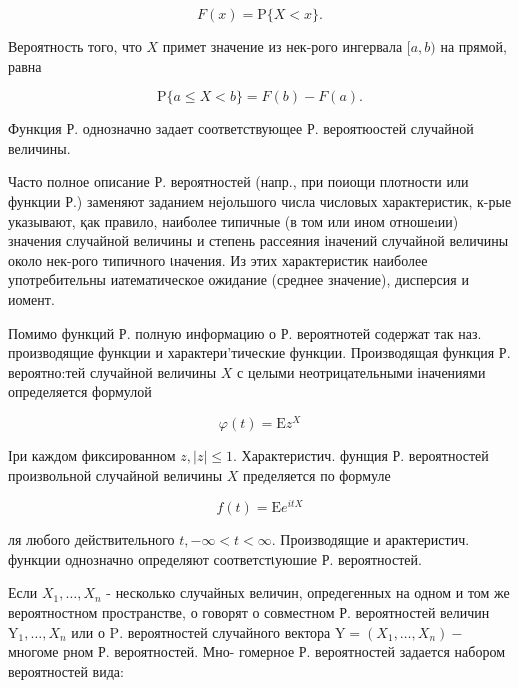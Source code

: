 \documentclass[10pt]{article}
\begin{document}
\[

F(x)=\mathrm{P}\{X<x\} .

\]



Вероятность того, что $X$ примет значение из нек-рого ингервала $[a, b)$ на прямой, равна



\[

\mathrm{P}\{a \leqslant X<b\}=F(b)-F(a) .

\]



Функция Р. однозначно задает соответствующее Р. вероятюостей случайной величины.



Часто полное описание Р. вероятностей (напр., при поиощи плотности или функции Р.) заменяют заданием нејольшого числа числовых характеристик, к-рые указывают, қак правило, наиболее типичные (в том или ином отношеıии) значения случайной величины и степень рассеяния іначений случайной величины около нек-рого типичного เначения. Из этих характеристик наиболее употребительны иатематическое ожидание (среднее значение), дисперсия и иомент.



Помимо функций Р. полную информацию о Р. вероятнотей содержат так наз. производящие функции и характери'тические функции. Производящая функция Р. вероятно:тей случайной величины $X$ с целыми неотрицательными іначениями определяется формулой



\[

\varphi(t)=\mathrm{E} z^{X}

\]



Іри каждом фиксированном $z,|z| \leqslant 1$. Характеристич. фунщия Р. вероятностей произвольной случайной величины $X$ пределяется по формуле



\[

f(t)=\mathrm{E} e^{i t X}

\]



ля любого действительного $t,-\infty<t<\infty$. Производящие и арактеристич. функции однозначно определяют соответстเуюшие Р. вероятностей.



Если $X_{1}, \ldots, X_{n}$ - несколько случайных величин, опредегенных на одном и том же вероятностном пространстве, о говорят о совместном Р. вероятностей величин $\mathrm{Y}_{1}, \ldots, X_{n}$ или о $\mathrm{P}$. вероятностей случайного вектора $\mathrm{Y}=\left(X_{1}, \ldots, X_{n}\right)-$ многоме рном Р. вероятностей. Мно- гомерное Р. вероятностей задается набором вероятностей вида:
\end{document}
